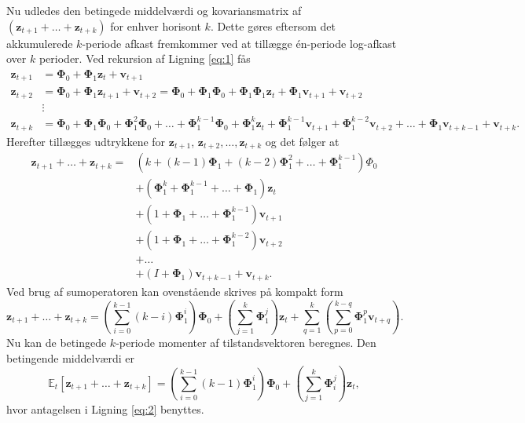 \documentclass[
  a4paper,
  oneside]{memoir}
\begin{document}
Nu udledes den betingede middelværdi og kovariansmatrix af \((\bm{z}_{t+1}+\dots+\bm{z}_{t+k})\) for enhver horisont \(k\). Dette gøres eftersom det akkumulerede \(k\)-periode afkast fremkommer ved at tillægge én-periode log-afkast over \(k\) perioder. Ved rekursion af Ligning \eqref{eq:1} fås
\begin{align*}
        \bm{z}_{t+1}&=\bm{\Phi}_0+\bm{\Phi}_1 \bm{z}_t+\bm{v}_{t+1}\\
        \bm{z}_{t+2}&=\bm{\Phi}_0+\bm{\Phi}_1 \bm{z}_{t+1}+\bm{v}_{t+2}=\bm{\Phi}_0+\bm{\Phi}_1\bm{\Phi}_0+\bm{\Phi}_1\bm{\Phi}_1 \bm{z}_t +\bm{\Phi}_1 \bm{v}_{t+1}+\bm{v}_{t+2}\\
        &\vdots\\
        \bm{z}_{t+k}&=\bm{\Phi}_0+\bm{\Phi}_1\bm{\Phi}_0+\bm{\Phi}_1^2\bm{\Phi}_0+\dots+\bm{\Phi}_1^{k-1}\bm{\Phi}_0+\bm{\Phi}_1^k \bm{z}_t+\bm{\Phi}_1^{k-1}\bm{v}_{t+1}+\bm{\Phi}_1^{k-2}\bm{v}_{t+2}+\dots+\bm{\Phi}_1 \bm{v}_{t+k-1}+\bm{v}_{t+k}.
    \end{align*}
Herefter tillægges udtrykkene for \(\bm{z}_{t+1}\), \(\bm{z}_{t+2},\dots,\bm{z}_{t+k}\) og det følger at
\begin{align*}
        \bm{z}_{t+1}+\dots+\bm{z}_{t+k}=&\left(k+(k-1)\bm{\Phi}_1+(k-2)\bm{\Phi}_1^2+\dots+\bm{\Phi}_1^{k-1}\right)\Phi_0\\
        &+\left(\bm{\Phi}_1^k+\bm{\Phi}_1^{k-1}+\dots+\bm{\Phi}_1\right)\bm{z}_t\\
        &+\left(1+\bm{\Phi}_1+\dots+\bm{\Phi}_1^{k-1}\right)\bm{v}_{t+1}\\
        &+\left(1+\bm{\Phi}_1+\dots+\bm{\Phi}_1^{k-2}\right)\bm{v}_{t+2}\\
        &+\dots\\
        &+(I+\bm{\Phi}_1)\bm{v}_{t+k-1}+\bm{v}_{t+k}.
    \end{align*}
Ved brug af sumoperatoren kan ovenstående skrives på kompakt form
\begin{equation}
        \bm{z}_{t+1}+\dots+\bm{z}_{t+k}=\left(\sum_{i=0}^{k-1} (k-i)\bm{\Phi}_1^i\right)\bm{\Phi}_0+\left(\sum_{j=1}^k \bm{\Phi}_1^j\right)\bm{z}_t+\sum_{q=1}^k\left(\sum_{p=0}^{k-q} \bm{\Phi}_1^p \bm{v}_{t+q}\right).
    \end{equation}
Nu kan de betingede \(k\)-periode momenter af tilstandsvektoren beregnes. Den betingende middelværdi er
\begin{equation}
        \mathbb{E}_t[\bm{z}_{t+1}+\dots+\bm{z}_{t+k}]=\left(\sum_{i=0}^{k-1}(k-1)\bm{\Phi}_1^i\right)\bm{\Phi}_0+\left(\sum_{j=1}^k \bm{\Phi}_i^j\right)\bm{z}_t,
    \end{equation}
hvor antagelsen i Ligning \eqref{eq:2} benyttes.
\end{document}

